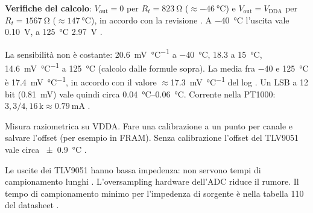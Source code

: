 \textbf{Verifiche del calcolo}: $V_\text{out}=0$ per $R_t = \SI{823}{\ohm}$ ($\approx\SI{-46}{\celsius}$) e $V_\text{out} = V_\text{DDA}$ per $R_t = \SI{1567}{\ohm}$ ($\approx\SI{+147}{\celsius}$), in accordo con la revisione . A \SI{-40}{\celsius} l'uscita vale \SI{0.10}{\volt}, a \SI{+125}{\celsius} \SI{2.97}{\volt} .

\begin{center}
\end{center}

La sensibilità non è costante: \SI{20.6}{\milli\volt\per\celsius} a \SI{-40}{\celsius}, \SI{18.3}{} a \SI{15}{\celsius}, \SI{14.6}{\milli\volt\per\celsius} a \SI{125}{\celsius} (calcolo dalle formule sopra). La media fra \SI{-40}{} e \SI{125}{\celsius} è \SI{17.4}{\milli\volt\per\celsius}, in accordo con il valore $\approx$\SI{17.3}{\milli\volt\per\celsius} del log . Un LSB a 12 bit (\SI{0.81}{\milli\volt}) vale quindi circa \SIrange{0.04}{0.06}{\celsius}. Corrente nella PT1000: $3{,}3/4{,}16\,\text{k} \approx \SI{0.79}{\milli\ampere}$ .

\begin{regola}[F-08: calibrazione]
Misura raziometrica su VDDA. Fare una calibrazione a un punto per canale e salvare l'offset (per esempio in FRAM). Senza calibrazione l'offset del TLV9051 vale circa \SI{\pm0.9}{\celsius} .
\end{regola}

\begin{nota}
Le uscite dei TLV9051 hanno bassa impedenza: non servono tempi di campionamento lunghi . L'oversampling hardware dell'ADC riduce il rumore. Il tempo di campionamento minimo per l'impedenza di sorgente è nella tabella 110 del datasheet .
\end{nota}

